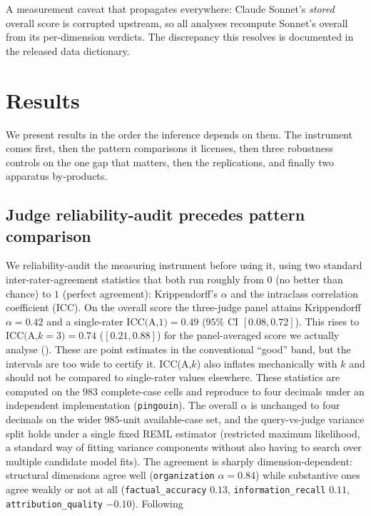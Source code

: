 \documentclass[11pt]{article}
\newcommand{\dimrow}[1]{\texttt{#1}}
\begin{document}
A measurement caveat that propagates everywhere: Claude Sonnet's \emph{stored}
overall score is corrupted upstream, so all analyses recompute Sonnet's overall from
its per-dimension verdicts. The discrepancy this resolves is
documented in the released data dictionary.
\section{Results}\label{sec:results}

We present results in the order the inference depends on them. The instrument comes
first, then the pattern comparisons it licenses, then three robustness controls on the
one gap that matters, then the replications, and finally two apparatus by-products.

\subsection{Judge reliability-audit precedes pattern comparison}\label{sec:judgeval}
We reliability-audit the measuring instrument before using it, using two standard
inter-rater-agreement statistics that both run roughly from $0$ (no better than chance)
to $1$ (perfect agreement): Krippendorff's $\alpha$ and the intraclass correlation
coefficient (ICC). On the overall score the three-judge panel attains Krippendorff
$\alpha=0.42$ \citep{krippendorff2004content} and a single-rater $\text{ICC(A,1)}=0.49$
\citep{shrout1979icc} ($95\%$ CI $[0.08, 0.72]$). This rises to
$\text{ICC(A,}k{=}3)=0.74$ ($[0.21, 0.88]$) for the panel-averaged score we actually
analyse (). These are point estimates in the conventional ``good'' band,
but the intervals are too wide to certify it. ICC(A,$k$) also inflates mechanically with $k$ and should not be
compared to single-rater values elsewhere. These statistics are computed on the $983$
complete-case cells and reproduce to four decimals under an independent implementation
(\texttt{pingouin}). The overall $\alpha$ is unchanged to four decimals on the wider
$985$-unit available-case set, and
the query-vs-judge variance split holds under a single fixed REML estimator (restricted
maximum likelihood, a standard way of fitting variance components without also having to
search over multiple candidate model fits). The
agreement is sharply dimension-dependent: structural dimensions agree well
(\dimrow{organization} $\alpha=0.84$) while substantive ones agree weakly or not at all
(\dimrow{factual\_accuracy} $0.13$, \dimrow{information\_recall} $0.11$,
\dimrow{attribution\_quality} $-0.10$). Following
\end{document}

